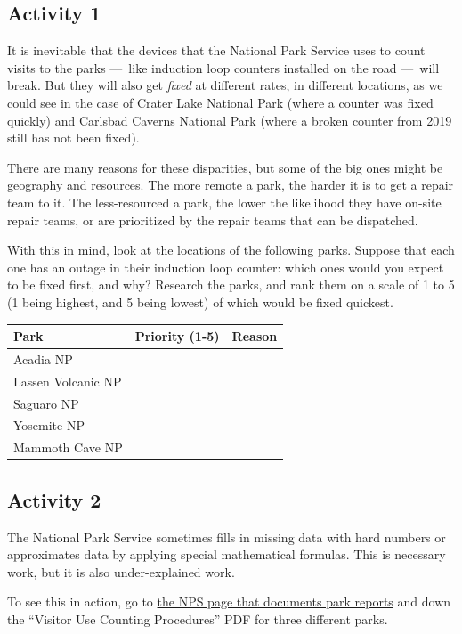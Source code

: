 \documentclass[
  letterpaper,
  DIV=11,
  numbers=noendperiod]{scrartcl}
\begin{document}
\subsection{Activity 1}\label{activity-1-1}

It is inevitable that the devices that the National Park Service uses to
count visits to the parks ---~like induction loop counters installed on
the road ---~will break. But they will also get \emph{fixed} at
different rates, in different locations, as we could see in the case of
Crater Lake National Park (where a counter was fixed quickly) and
Carlsbad Caverns National Park (where a broken counter from 2019 still
has not been fixed).

There are many reasons for these disparities, but some of the big ones
might be geography and resources. The more remote a park, the harder it
is to get a repair team to it. The less-resourced a park, the lower the
likelihood they have on-site repair teams, or are prioritized by the
repair teams that can be dispatched.

With this in mind, look at the locations of the following parks. Suppose
that each one has an outage in their induction loop counter: which ones
would you expect to be fixed first, and why? Research the parks, and
rank them on a scale of 1 to 5 (1 being highest, and 5 being lowest) of
which would be fixed quickest.

\begin{longtable}[]{@{}lll@{}}
\toprule\noalign{}
Park & Priority (1-5) & Reason \\
\midrule\noalign{}
\endhead
\bottomrule\noalign{}
\endlastfoot
Acadia NP & & \\
Lassen Volcanic NP & & \\
Saguaro NP & & \\
Yosemite NP & & \\
Mammoth Cave NP & & \\
\end{longtable}

\subsection{Activity 2}\label{activity-2}

The National Park Service sometimes fills in missing data with hard
numbers or approximates data by applying special mathematical formulas.
This is necessary work, but it is also under-explained work.

To see this in action, go to
\href{https://irma.nps.gov/Stats/Reports/Park}{the NPS page that
documents park reports} and down the ``Visitor Use Counting Procedures''
PDF for three different parks.
\end{document}

